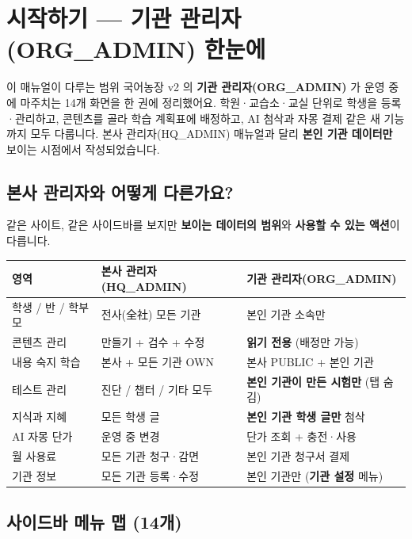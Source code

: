 \chapter*{시작하기 — 기관 관리자(ORG\_ADMIN) 한눈에}

\begin{summarybox}{이 매뉴얼이 다루는 범위}
국어농장 v2 의 \textbf{기관 관리자(ORG\_ADMIN)} 가 운영 중에 마주치는 14개 화면을 한 권에 정리했어요. 학원·교습소·교실 단위로 학생을 등록·관리하고, 콘텐츠를 골라 학습 계획표에 배정하고, AI 첨삭과 자몽 결제 같은 새 기능까지 모두 다룹니다. 본사 관리자(HQ\_ADMIN) 매뉴얼과 달리 \textbf{본인 기관 데이터만} 보이는 시점에서 작성되었습니다.
\end{summarybox}

\section*{본사 관리자와 어떻게 다른가요?}

같은 사이트, 같은 사이드바를 보지만 \textbf{보이는 데이터의 범위}와 \textbf{사용할 수 있는 액션}이 다릅니다.

\medskip
\noindent\begin{tabular}{@{}p{3.5cm} p{5.5cm} p{5.5cm}@{}}
\toprule
\textbf{영역} & \textbf{본사 관리자(HQ\_ADMIN)} & \textbf{기관 관리자(ORG\_ADMIN)} \\
\midrule
학생 / 반 / 학부모 & 전사(全社) 모든 기관 & 본인 기관 소속만 \\
콘텐츠 관리 & 만들기 + 검수 + 수정 & \textbf{읽기 전용} (배정만 가능) \\
내용 숙지 학습 & 본사 + 모든 기관 OWN & 본사 PUBLIC + 본인 기관 \\
테스트 관리 & 진단 / 챕터 / 기타 모두 & \textbf{본인 기관이 만든 시험만} (탭 숨김) \\
지식과 지혜 & 모든 학생 글 & \textbf{본인 기관 학생 글만} 첨삭 \\
AI 자몽 단가 & 운영 중 변경 & 단가 조회 + 충전·사용 \\
월 사용료 & 모든 기관 청구·감면 & 본인 기관 청구서 결제 \\
기관 정보 & 모든 기관 등록·수정 & 본인 기관만 (\textbf{기관 설정} 메뉴) \\
\bottomrule
\end{tabular}

\section*{사이드바 메뉴 맵 (14개)}

